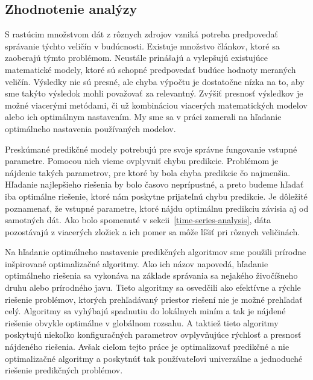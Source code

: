 \documentclass[a4paper,slovak,12pt,appendix]{article}
\begin{document}

\subsection{Zhodnotenie analýzy}
S rastúcim množstvom dát z rôznych zdrojov vzniká potreba predpovedať správanie
týchto veličín v budúcnosti. Existuje množstvo článkov, ktoré sa zaoberajú
týmto problémom. Neustále prinášajú a vylepšujú existujúce matematické modely,
ktoré sú schopné predpovedať budúce hodnoty meraných veličín. Výsledky nie sú
presné, ale chyba výpočtu je dostatočne nízka na to, aby sme takýto výsledok
mohli považovať za relevantný. Zvýšiť presnosť výsledkov je možné viacerými
metódami, či už kombináciou viacerých matematických modelov alebo ich
optimálnym nastavením. My sme sa v práci zamerali na hľadanie optimálneho
nastavenia používaných modelov.

Preskúmané predikčné modely potrebujú pre svoje správne fungovanie vstupné
parametre. Pomocou nich vieme ovplyvniť chybu predikcie. Problémom je nájdenie
takých parametrov, pre ktoré by bola chyba predikcie čo najmenšia. Hľadanie
najlepšieho riešenia by bolo časovo neprípustné, a preto budeme hľadať iba
optimálne riešenie, ktoré nám poskytne prijateľnú chybu predikcie. Je dôležité
poznamenať, že vstupné parametre, ktoré nájdu optimálnu predikciu závisia aj od
samotných dát. Ako bolo spomenuté v sekcii~\ref{time-series-analysis}, dáta
pozostávajú z viacerých zložiek a ich pomer sa môže líšiť pri rôznych
veličinách.

Na hľadanie optimálneho nastavenie predikčných algoritmov sme použili
prírodne inšpirované optimalizačné algoritmy. Ako ich názov napovedá, hľadanie
optimálneho riešenia sa vykonáva na základe správania sa nejakého živočíšneho
druhu alebo prírodného javu. Tieto algoritmy sa osvedčili ako efektívne a
rýchle riešenie problémov, ktorých prehľadávaný priestor riešení nie je možné
prehľadať celý. Algoritmy sa vyhýbajú spadnutiu do lokálnych miním a tak je
nájdené riešenie obvykle optimálne v globálnom rozsahu. A taktiež tieto algoritmy
poskytujú niekoľko konfiguračných parametrov ovplyvňujúce rýchlosť a presnosť
nájdeného riešenia. Avšak cieľom tejto práce je optimalizovať predikčné
a nie optimalizačné algoritmy a poskytnúť tak používateľovi univerzálne
a jednoduché riešenie predikčných problémov.
\end{document}
